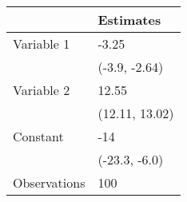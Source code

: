 \begin{tabular}{ll}
\toprule
{} &       Estimates \\
\midrule
Variable 1   &           -3.25 \\
             &   (-3.9, -2.64) \\
Variable 2   &           12.55 \\
             &  (12.11, 13.02) \\
Constant     &             -14 \\
             &   (-23.3, -6.0) \\
Observations &             100 \\
\bottomrule
\end{tabular}
